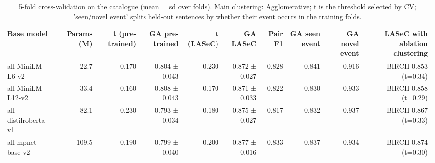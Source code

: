 \begin{table}[t]
\centering
\caption{5-fold cross-validation on the catalogue (mean ± sd over folds). Main clustering: Agglomerative; t is the threshold selected by CV; 'seen/novel event' splits held-out sentences by whether their event occurs in the training folds.}
\label{tab:cv}
\small
\begin{tabular}{lrrrrrrrrr}
\toprule
Base model & Params (M) & t (pre-trained) & GA pre-trained & t (LASeC) & GA LASeC & Pair F1 & GA seen event & GA novel event & LASeC with ablation clustering \\
\midrule
all-MiniLM-L6-v2 & 22.7 & 0.170 & 0.804 ± 0.043 & 0.230 & 0.872 ± 0.027 & 0.828 & 0.841 & 0.916 & BIRCH 0.853 (t=0.34) \\
all-MiniLM-L12-v2 & 33.4 & 0.160 & 0.808 ± 0.043 & 0.170 & 0.871 ± 0.033 & 0.822 & 0.830 & 0.933 & BIRCH 0.858 (t=0.29) \\
all-distilroberta-v1 & 82.1 & 0.230 & 0.793 ± 0.034 & 0.180 & 0.875 ± 0.027 & 0.817 & 0.832 & 0.937 & BIRCH 0.867 (t=0.33) \\
all-mpnet-base-v2 & 109.5 & 0.190 & 0.799 ± 0.040 & 0.200 & 0.877 ± 0.016 & 0.833 & 0.837 & 0.934 & BIRCH 0.874 (t=0.30) \\
\bottomrule
\end{tabular}
\end{table}
